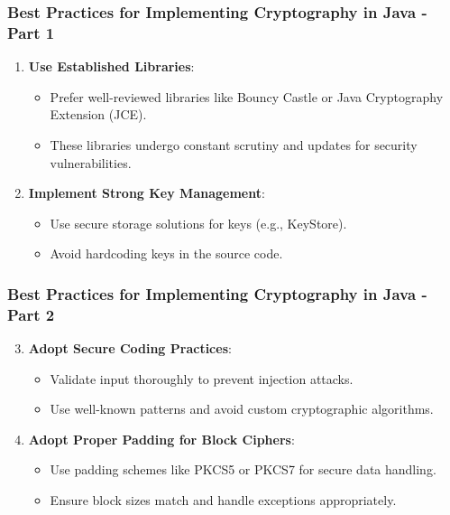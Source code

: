 \documentclass{beamer}
\begin{document}
\begin{frame}[fragile]
    \frametitle{Best Practices for Implementing Cryptography in Java - Part 1}
    \begin{enumerate}
        \item \textbf{Use Established Libraries}:
        \begin{itemize}
            \item Prefer well-reviewed libraries like Bouncy Castle or Java Cryptography Extension (JCE).
            \item These libraries undergo constant scrutiny and updates for security vulnerabilities.
        \end{itemize}
        
        \item \textbf{Implement Strong Key Management}:
        \begin{itemize}
            \item Use secure storage solutions for keys (e.g., KeyStore).
            \item Avoid hardcoding keys in the source code.
        \end{itemize}        
    \end{enumerate}
\end{frame}

\begin{frame}[fragile]
    \frametitle{Best Practices for Implementing Cryptography in Java - Part 2}
    \begin{enumerate}
        \setcounter{enumi}{2} %
        \item \textbf{Adopt Secure Coding Practices}:
        \begin{itemize}
            \item Validate input thoroughly to prevent injection attacks.
            \item Use well-known patterns and avoid custom cryptographic algorithms.
        \end{itemize}
        
        \item \textbf{Adopt Proper Padding for Block Ciphers}:
        \begin{itemize}
            \item Use padding schemes like PKCS5 or PKCS7 for secure data handling.
            \item Ensure block sizes match and handle exceptions appropriately.
        \end{itemize}
    \end{enumerate}
\end{frame}
\end{document}
